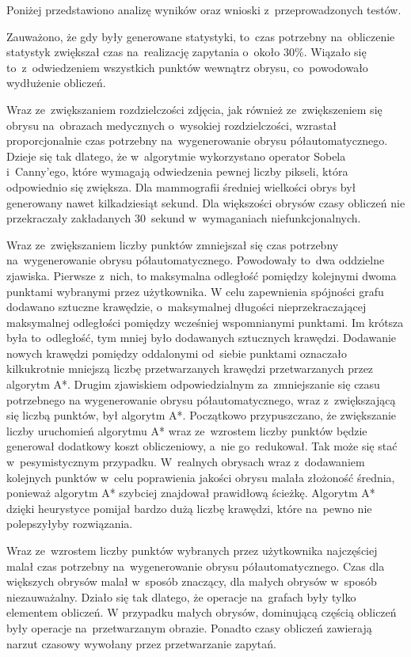 \documentclass[a4paper,11pt,twoside,openright]{report}
\theoremstyle{definition}
\begin{document}
Poniżej przedstawiono analizę wyników oraz wnioski z~przeprowadzonych testów.

Zauważono, że gdy były generowane statystyki, to~czas potrzebny na~obliczenie statystyk
zwiększał czas na~realizację zapytania o~około 30\%. Wiązało się to~z~odwiedzeniem
wszystkich punktów wewnątrz obrysu, co~powodowało wydłużenie obliczeń.

Wraz ze~zwiększaniem rozdzielczości zdjęcia, jak również ze~zwiększeniem się
obrysu na~obrazach medycznych o~wysokiej rozdzielczości, wzrastał proporcjonalnie
czas potrzebny na~wygenerowanie obrysu półautomatycznego. Dzieje się tak dlatego,
że w~algorytmie wykorzystano operator Sobela i~Canny'ego, które wymagają odwiedzenia
pewnej liczby pikseli, która odpowiednio się zwiększa. Dla mammografii średniej
wielkości obrys był generowany nawet kilkadziesiąt sekund. Dla większości obrysów
czasy obliczeń nie przekraczały zakładanych 30~sekund w~wymaganiach niefunkcjonalnych.

Wraz ze~zwiększaniem liczby punktów zmniejszał się czas potrzebny na~wygenerowanie
obrysu półautomatycznego. Powodowały to~dwa oddzielne zjawiska. Pierwsze z~nich, to
maksymalna odległość pomiędzy kolejnymi dwoma punktami wybranymi przez użytkownika.
W celu zapewnienia spójności grafu dodawano sztuczne krawędzie, o~maksymalnej długości
nieprzekraczającej maksymalnej odległości pomiędzy wcześniej wspomnianymi punktami.
Im krótsza była to~odległość, tym mniej było dodawanych sztucznych krawędzi.
Dodawanie nowych krawędzi pomiędzy oddalonymi od~siebie punktami oznaczało
kilkukrotnie mniejszą liczbę przetwarzanych krawędzi przetwarzanych przez algorytm
A*. Drugim zjawiskiem odpowiedzialnym za~zmniejszanie się czasu potrzebnego na
wygenerowanie obrysu półautomatycznego, wraz z~zwiększającą się liczbą punktów,
był algorytm A*. Początkowo przypuszczano, że zwiększanie liczby uruchomień algorytmu
A* wraz ze~wzrostem liczby punktów będzie generował dodatkowy koszt obliczeniowy,
a~nie go~redukował. Tak może się stać w~pesymistycznym przypadku. W~realnych
obrysach wraz z~dodawaniem kolejnych punktów w~celu poprawienia jakości obrysu
malała złożoność średnia, ponieważ algorytm A* szybciej znajdował prawidłową
ścieżkę. Algorytm A* dzięki heurystyce pomijał bardzo dużą liczbę krawędzi,
które na~pewno nie polepszyłyby rozwiązania.

Wraz ze~wzrostem liczby punktów wybranych przez użytkownika najczęściej malał
czas potrzebny na~wygenerowanie obrysu półautomatycznego. Czas dla większych
obrysów malał w~sposób znaczący, dla małych obrysów w~sposób niezauważalny.
Działo się tak dlatego, że operacje na~grafach były tylko elementem obliczeń. W
przypadku małych obrysów, dominującą częścią obliczeń były operacje na~przetwarzanym
obrazie. Ponadto czasy obliczeń zawierają narzut czasowy wywołany przez
przetwarzanie zapytań.
\end{document}
